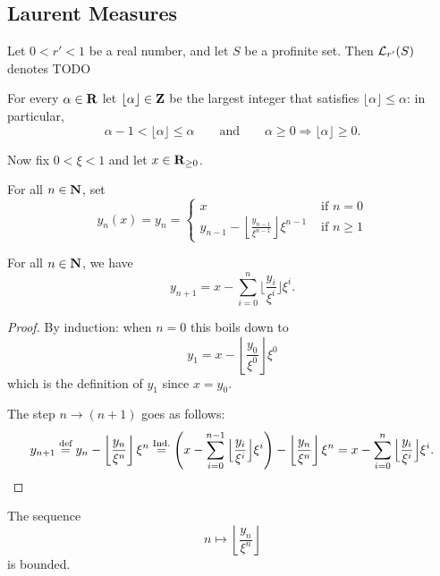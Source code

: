 \subsection{Laurent Measures}

\begin{definition}
  \label{laurent-measures}
  \leanok
  Let $0 < r' < 1$ be a real number, and let $S$ be a profinite set.
  Then $\mathcal L_{r'}(S)$ denotes TODO
\end{definition}

For every $\alpha\in\mathbf{R}$ let $\lfloor \alpha\rfloor\in\mathbf{Z}$ be the largest integer that satisfies $\lfloor \alpha\rfloor\le \alpha$: in particular,
\[
  \alpha-1 < \lfloor \alpha\rfloor\le \alpha
  \qquad\text{and}\qquad
  \alpha\geq 0 \Longrightarrow \lfloor \alpha\rfloor \geq 0.
\]

Now fix $0< \xi<1$ and let $x\in\mathbf{R}_{\geq 0}$. 

\begin{definition}
  \label{theta.y}
  \leanok
	For all $n\in\mathbf{N}$, set
	\[
		y_n(x)=y_n=
		\begin{cases}
			x&\text{ if } n = 0 \\
			y_{n-1} - \left\lfloor \frac{y_{n-1}}{\xi^{n-1}} \right\rfloor \xi^{n-1} & \text{ if } n \ge 1
		\end{cases}
	\]
\end{definition}

\begin{lemma}
  \label{theta.finite_sum}
  \leanok
  For all $n\in\mathbf{N}$, we have
  \[
    y_{n+1} = x - \sum_{i=0}^n \Big\lfloor \frac{y_i}{\xi^i} \Big\rfloor \xi^i.
  \]
\end{lemma}

\begin{proof}
  \leanok
  By induction: when $n=0$ this boils down to
  \[
    y_1=x-\left\lfloor \frac{y_0}{\xi^0}\right\rfloor \xi^0
  \]
  which is the definition of $y_1$ since $x=y_0$.

	The step $n\to (n+1)$ goes as follows:
	\[
		y_{n+1} \overset{\text{def}}{=} y_{n} - \left\lfloor \frac{y_{n}}{\xi^{n}} \right\rfloor \xi^{n}
		\overset{\text{Ind.}}{=} \left(x - \sum_{i=0}^{n-1} \Big\lfloor \frac{y_i}{\xi^i} \Big\rfloor\xi^i\right) -
		\left\lfloor \frac{y_{n}}{\xi^{n}} \right\rfloor\xi^{n}
		= x - \sum_{i=0}^n \Big\lfloor \frac{y_i}{\xi^i} \Big\rfloor \xi^i.
		\qedhere
	\]
\end{proof}

\begin{lemma}
  \label{theta.bounded}
	The sequence
	\[
		n \mapsto \left\lfloor \frac{y_n}{\xi^n} \right\rfloor
	\]
	is bounded.
\end{lemma}

